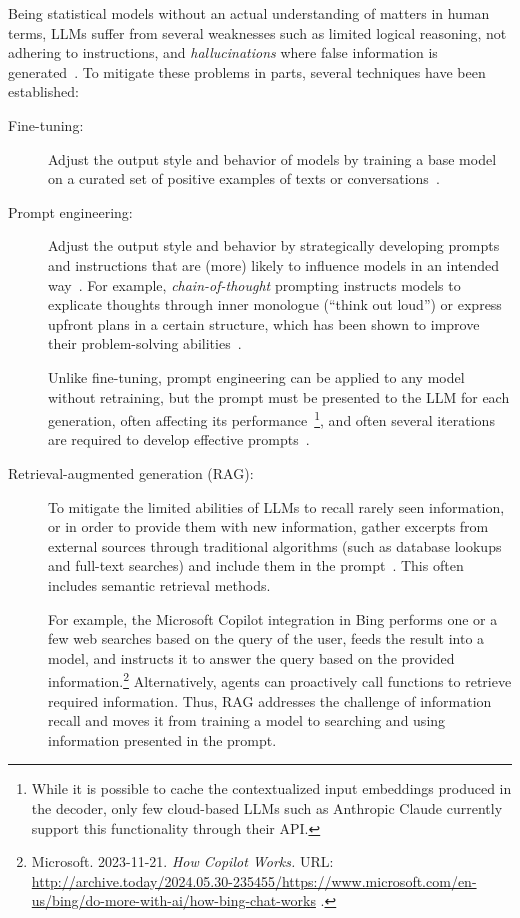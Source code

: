 Being statistical models without an actual understanding of matters in human terms, LLMs suffer from several weaknesses such as limited logical reasoning, not adhering to instructions, and \emph{hallucinations} where false information is generated~\cite{openai2024gpt4}.
To mitigate these problems in parts, several techniques have been established:
%
\begin{description}
	\item[Fine-tuning:] Adjust the output style and behavior of models by training a base model on a curated set of positive examples of texts or conversations~\cite{kojima2022large,wei2022finetuned}.

	\item[Prompt engineering:] Adjust the output style and behavior by strategically developing prompts and instructions that are (more) likely to influence models in an intended way~\cite{white2023prompt}.
	For example, \emph{chain-of-thought} prompting instructs models to explicate thoughts through inner monologue (``think out loud'') or express upfront plans in a certain structure, which has been shown to improve their problem-solving abilities~\cite{wei2023chainofthought}.

	Unlike fine-tuning, prompt engineering can be applied to any model without retraining, but the prompt must be presented to the LLM for each generation, often affecting its performance~\cite{zhao2023survey}\footnote{While it is possible to cache the contextualized input embeddings produced in the decoder, only few cloud-based LLMs such as Anthropic Claude currently support this functionality through their API.}, and often several iterations are required to develop effective prompts~\cite{white2023prompt}.

	\item[Retrieval-augmented generation (RAG):] To mitigate the limited abilities of LLMs to recall rarely seen information, or in order to provide them with new information, gather excerpts from external sources through traditional algorithms (such as database lookups and full-text searches) and include them in the prompt~\cite{lewis2020retrieval}.
	This often includes semantic retrieval methods.

	For example, the Microsoft Copilot integration in Bing performs one or a few web searches based on the query of the user, feeds the result into a \gptfouro model, and instructs it to answer the query based on the provided information.\footnote{
		Microsoft. 2023-11-21. \emph{How Copilot Works.}
		URL:
		\url{http://archive.today/2024.05.30-235455/https://www.microsoft.com/en-us/bing/do-more-with-ai/how-bing-chat-works}%
		.
	}
	Alternatively, agents can proactively call functions to retrieve required information.
	Thus, RAG addresses the challenge of information recall and moves it from training a model to searching and using information presented in the prompt.
\end{description}

